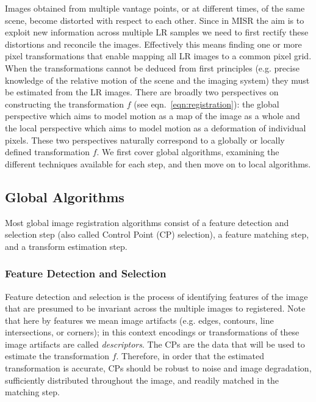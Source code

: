 
Images obtained from multiple vantage points, or at different times, of the same scene, become distorted with respect
to each other.
%
Since in MISR the aim is to exploit new information across multiple LR samples we need to first rectify these distortions and reconcile the images.
%
Effectively this means finding one or more pixel transformations that enable mapping all LR images to a common pixel grid.
%
When the transformations cannot be deduced from first principles (e.g. precise knowledge of the relative motion of the scene and the imaging system) they must be estimated from the LR images.
%
There are broadly two perspectives on constructing the transformation \(f\) (see eqn.~\eqref{eqn:registration}): the global perspective which aims to model motion as a map of the image as a whole and the local perspective which aims to model motion as a deformation of individual pixels.
%
These two perspectives naturally correspond to a globally or locally defined transformation \(f\).
%
We first cover global algorithms, examining the different techniques available for each step, and then move on to local algorithms.

\subsection{Global Algorithms}

Most global image registration algorithms consist of a feature detection and selection step (also called Control Point (CP) selection), a feature matching step, and a transform estimation step.
%

\subsubsection{Feature Detection and Selection}

Feature detection and selection is the process of identifying features of the image that are presumed to be invariant across the multiple images to registered.
%
Note that here by features we mean image artifacts (e.g. edges, contours, line intersections, or corners); in this context encodings or transformations of these image artifacts are called \textit{descriptors}.
%
The CPs are the data that will be used to estimate the transformation \(f\).
%
Therefore, in order that the estimated transformation is accurate, CPs should be robust to noise and image degradation, sufficiently distributed throughout the image, and readily matched in the matching step.


